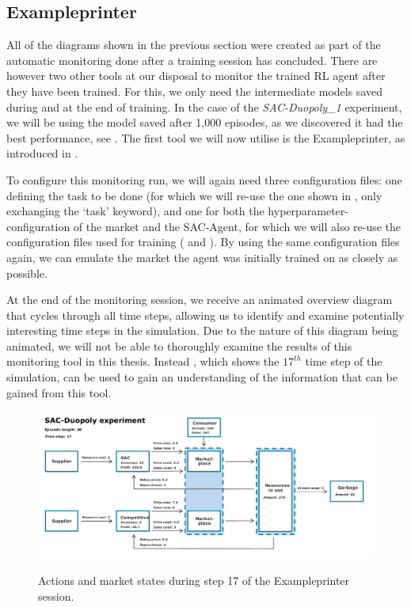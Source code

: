 \subsection{Exampleprinter}

All of the diagrams shown in the previous section were created as part of the automatic monitoring done after a training session has concluded. There are however two other tools at our disposal to monitor the trained RL agent after they have been trained. For this, we only need the intermediate models saved during and at the end of training. In the case of the \emph{SAC-Duopoly\_1} experiment, we will be using the model saved after 1,000 episodes, as we discovered it had the best performance, see . The first tool we will now utilise is the Exampleprinter, as introduced in .

To configure this monitoring run, we will again need three configuration files: one defining the task to be done (for which we will re-use the one shown in , only exchanging the `task' keyword), and one for both the hyperparameter-configuration of the market and the SAC-Agent, for which we will also re-use the configuration files used for training ( and ). By using the same configuration files again, we can emulate the market the agent was initially trained on as closely as possible.

At the end of the monitoring session, we receive an animated overview diagram that cycles through all time steps, allowing us to identify and examine potentially interesting time steps in the simulation. Due to the nature of this diagram being animated, we will not be able to thoroughly examine the results of this monitoring tool in this thesis. Instead , which shows the $17^{th}$ time step of the simulation, can be used to gain an understanding of the information that can be gained from this tool.

\begin{figure}[t]
	\centering
	\includegraphics[width = \textwidth]{images/experiments/SACDuopoly/exampleprinter/ExampleprinterStep17.pdf}\\
	\caption{Actions and market states during step 17 of the Exampleprinter session.}\label{fig:SACDuopolyExampleprinter17}
\end{figure}

